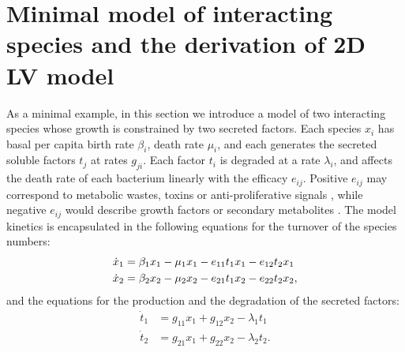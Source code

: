\section{Minimal model of interacting species and the derivation of 2D LV model} %
As a minimal example, in this section we introduce a model of two interacting species whose growth is constrained by two secreted factors. Each species $x_i$ has basal per capita birth rate $\beta_i$, death rate $\mu_i$, and each generates the secreted soluble factors $t_j$ at rates $g_{ji}$. Each factor $t_i$ is degraded at a rate $\lambda_i$, and affects the death rate of each bacterium linearly with the efficacy $e_{ij}$. Positive $e_{ij}$ may correspond to metabolic wastes, toxins or anti-proliferative signals \cite{Jacob1989,Maplestone1992,VanMelderen2009,Rankin2012,Shen2015,Wynn2015}, while negative $e_{ij}$ would describe growth factors or secondary metabolites \cite{Maplestone1992,Reya2001,Wink2003}. The model kinetics is encapsulated in the following equations for the turnover of the species numbers:
\begin{align}
\dot{x}_1 &= \beta_1 x_1 - \mu_1 x_1 - e_{11} t_1 x_1 - e_{12} t_2 x_1 \notag \\
\dot{x}_2 &= \beta_2 x_2 - \mu_2 x_2 - e_{21} t_1 x_2 - e_{22} t_2 x_2 \label{eq-x-tox},
\end{align}
and the equations for the production and the degradation of the secreted factors:
\begin{align}
\dot{t}_1 &= g_{11} x_1 + g_{12}x_2 - \lambda_1 t_1  \nonumber \\
\dot{t}_2 &= g_{21} x_1 + g_{22}x_2 - \lambda_2 t_2. \label{eq-tox}
\end{align}

